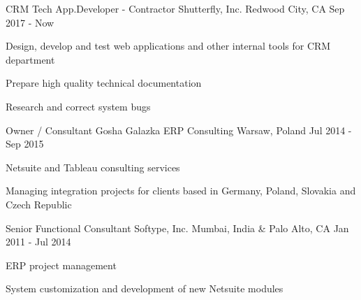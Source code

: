 
\begin{cventries}

	\cventry
		{CRM Tech App.Developer - Contractor}
		{Shutterfly, Inc.} %
		{Redwood City, CA} %
		{Sep 2017 - Now} %
		{
			\begin{cvitems} %
				\item {Design, develop and test web applications and other internal tools for CRM department}
				\item {Prepare high quality technical documentation}
				\item {Research and correct system bugs}
			\end{cvitems}
		}

	\cventry
		{Owner / Consultant}
		{Gosha Galazka ERP Consulting} %
		{Warsaw, Poland} %
		{Jul 2014 - Sep 2015} %
		{
			\begin{cvitems} %
				\item {Netsuite and Tableau consulting services}
				\item {Managing integration projects for clients based in Germany, Poland, Slovakia and Czech Republic}
			\end{cvitems}
		}


	\cventry
		{Senior Functional Consultant}
		{Softype, Inc.} %
		{Mumbai, India \& Palo Alto, CA} %
		{Jan 2011 - Jul 2014} %
		{
			\begin{cvitems} %
				\item {ERP project management}
				\item {System customization and development of new Netsuite modules}
			\end{cvitems}
		}

\end{cventries}
